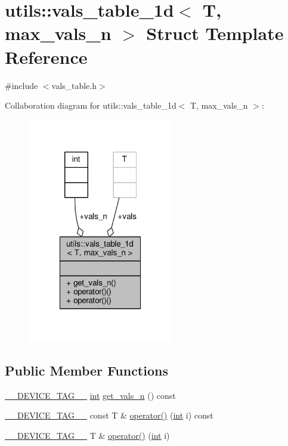 \hypertarget{structutils_1_1vals__table__1d}{\section{utils\-:\-:vals\-\_\-table\-\_\-1d$<$ T, max\-\_\-vals\-\_\-n $>$ Struct Template Reference}
\label{structutils_1_1vals__table__1d}
}


{\ttfamily \#include $<$vals\-\_\-table.\-h$>$}



Collaboration diagram for utils\-:\-:vals\-\_\-table\-\_\-1d$<$ T, max\-\_\-vals\-\_\-n $>$\-:\nopagebreak
\begin{figure}[H]
\begin{center}
\leavevmode
\includegraphics[width=180pt]{structutils_1_1vals__table__1d__coll__graph}
\end{center}
\end{figure}
\subsection*{Public Member Functions}
\begin{DoxyCompactItemize}
\item 
\hyperlink{scalar__traits_8h_a2396f3e69fc9792ad01b8b14a1a425e3}{\-\_\-\-\_\-\-D\-E\-V\-I\-C\-E\-\_\-\-T\-A\-G\-\_\-\-\_\-} \hyperlink{classint}{int} \hyperlink{structutils_1_1vals__table__1d_af700eb5a919edd9e38fb27769c908904}{get\-\_\-vals\-\_\-n} () const 
\item 
\hyperlink{scalar__traits_8h_a2396f3e69fc9792ad01b8b14a1a425e3}{\-\_\-\-\_\-\-D\-E\-V\-I\-C\-E\-\_\-\-T\-A\-G\-\_\-\-\_\-} const T \& \hyperlink{structutils_1_1vals__table__1d_a71aaf71ed5f894e41ef7f94c8a81693c}{operator()} (\hyperlink{classint}{int} i) const 
\item 
\hyperlink{scalar__traits_8h_a2396f3e69fc9792ad01b8b14a1a425e3}{\-\_\-\-\_\-\-D\-E\-V\-I\-C\-E\-\_\-\-T\-A\-G\-\_\-\-\_\-} T \& \hyperlink{structutils_1_1vals__table__1d_ae1074b2f845022a7492346400da6ff67}{operator()} (\hyperlink{classint}{int} i)
\end{DoxyCompactItemize}
